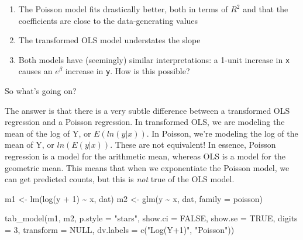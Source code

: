\documentclass[
  letterpaper,
  DIV=11,
  numbers=noendperiod]{scrreprt}
\newenvironment{Shaded}{\begin{snugshade}}{\end{snugshade}}
\newcommand{\AttributeTok}[1]{\textcolor[rgb]{0.49,0.56,0.16}{#1}}
\newcommand{\ConstantTok}[1]{\textcolor[rgb]{0.53,0.00,0.00}{#1}}
\newcommand{\DecValTok}[1]{\textcolor[rgb]{0.25,0.63,0.44}{#1}}
\newcommand{\FunctionTok}[1]{\textcolor[rgb]{0.02,0.16,0.49}{#1}}
\newcommand{\NormalTok}[1]{\textcolor[rgb]{0.00,0.44,0.13}{#1}}
\newcommand{\OtherTok}[1]{\textcolor[rgb]{0.00,0.44,0.13}{#1}}
\newcommand{\SpecialCharTok}[1]{\textcolor[rgb]{0.25,0.44,0.63}{#1}}
\newcommand{\StringTok}[1]{\textcolor[rgb]{0.25,0.44,0.63}{#1}}
\providecommand{\tightlist}{%
  \setlength{\itemsep}{0pt}\setlength{\parskip}{0pt}}\usepackage{longtable,booktabs,array}
\begin{document}
\begin{enumerate}
\def\labelenumi{\arabic{enumi}.}
\tightlist
\item
  The Poisson model fits drastically better, both in terms of \(R^2\)
  and that the coefficients are close to the data-generating values
\item
  The transformed OLS model understates the slope
\item
  Both models have (seemingly) similar interpretations: a 1-unit
  increase in \texttt{x} causes an \(e^\beta\) increase in \texttt{y}.
  How is this possible?
\end{enumerate}

So what's going on?

The answer is that there is a very subtle difference between a
transformed OLS regression and a Poisson regression. In transformed OLS,
we are modeling the mean of the log of Y, or \(E(ln(y|x))\). In Poisson,
we're modeling the log of the mean of Y, or \(ln(E(y|x))\). These are
not equivalent! In essence, Poisson regression is a model for the
arithmetic mean, whereas OLS is a model for the geometric mean. This
means that when we exponentiate the Poisson model, we can get predicted
counts, but this is \emph{not} true of the OLS model.

\begin{Shaded}
\begin{Highlighting}[]
\NormalTok{m1 }\OtherTok{\textless{}{-}} \FunctionTok{lm}\NormalTok{(}\FunctionTok{log}\NormalTok{(y }\SpecialCharTok{+} \DecValTok{1}\NormalTok{) }\SpecialCharTok{\textasciitilde{}}\NormalTok{ x, dat)}
\NormalTok{m2 }\OtherTok{\textless{}{-}} \FunctionTok{glm}\NormalTok{(y }\SpecialCharTok{\textasciitilde{}}\NormalTok{ x, dat, }\AttributeTok{family =}\NormalTok{ poisson)}

\FunctionTok{tab\_model}\NormalTok{(m1, m2,}
          \AttributeTok{p.style =} \StringTok{"stars"}\NormalTok{,}
          \AttributeTok{show.ci =} \ConstantTok{FALSE}\NormalTok{,}
          \AttributeTok{show.se =} \ConstantTok{TRUE}\NormalTok{,}
          \AttributeTok{digits =} \DecValTok{3}\NormalTok{,}
          \AttributeTok{transform =} \ConstantTok{NULL}\NormalTok{,}
          \AttributeTok{dv.labels =} \FunctionTok{c}\NormalTok{(}\StringTok{"Log(Y+1)"}\NormalTok{, }\StringTok{"Poisson"}\NormalTok{))}
\end{Highlighting}
\end{Shaded}
\end{document}

